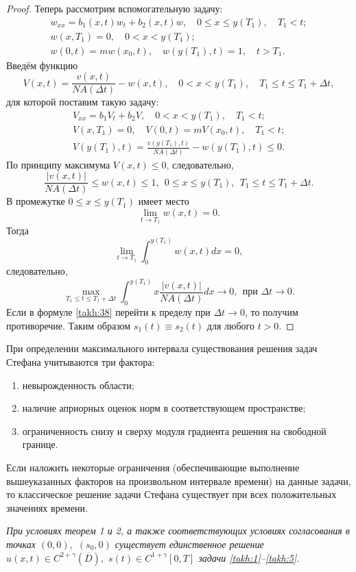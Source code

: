 \begin{proof}
Теперь рассмотрим вспомогательную задачу:
\begin{gather*}
w_{xx}=b_1(x,t)w_t+b_2(x,t)w,\quad  0\leq x\leq y(T_1), \quad  T_1< t;
\\
w(x,T_1)=0, \quad   0<x<y(T_1); \\ w(0,t)=mw(x_0,t), \quad w(y(T_1),t)=1, \quad  t>T_1.
\end{gather*}
Введём функцию
$$
V(x,t)=\frac{v(x,t)}{NA(\Delta t)}-w(x,t), \quad  0<x<y(T_1), \quad 
T_1\leq t\leq T_1+\Delta t,
$$
для которой поставим такую задачу:
\begin{gather*}
V_{xx}=b_1V_t+b_2V, \quad  0<x<y(T_1), \quad  T_1<t;
\\
V(x,T_1)=0, \quad  V(0, t)=mV(x_0, t), \quad  T_1<t;
\\
V(y(T_1),t)=\frac{v(y(T_1),t)}{NA(\Delta t)}-w(y(T_1),t)\leq 0.
\end{gather*}
По принципу максимума $V(x,t)\leq0$, следовательно,
$$
\frac{|v(x,t)|}{NA(\Delta t)}\leq w(x,t)\leq1, \ \ 0\leq x\leq
y(T_1), \ \ T_1\leq t\leq T_1+\Delta t.
$$
В промежутке $0\leq x\leq y(T_1)$ имеет место
$$
\lim\limits_{t\to  T_1}w(x,t)=0.
$$
Тогда 
$$
\lim\limits_{t\to  T_1}\int_{0}^{y(T_1)}w(x,t)dx=0,
$$
следовательно,
$$
\max\limits_{T_1\leq t\leq T_1+\Delta t}\int_{0}^{y(T_1)}
x\frac{|v(x,t)|}{NA(\Delta t)}dx\to 0, \ \ \text{при }
\Delta t\to 0.
$$
Если в формуле \eqref{takh:38} перейти к пределу при $\Delta t\to 0$,
то получим противоречие.
Таким образом $s_1(t)\equiv s_2(t)$ для любого $t>0$. \end{proof}

\smallskip

При определении максимального интервала существования решения
задач Стефана учитываются три фактора: 
\begin{enumerate}
\item невырожденность области;
\item  наличие априорных оценок норм в соответствующем пространстве;
\item  ограниченность снизу и сверху модуля градиента решения на
свободной границе.
\end{enumerate}

Если наложить некоторые ограничения  (обеспечивающие выполнение вышеуказанных факторов на произвольном интервале времени) на данные задачи, то классическое решение задачи Стефана существует при всех положительных значениях времени.

\begin{theorem}[4]\sl При условиях теорем 1 и 2{\rm ,} а также
соответствующих условиях согласования в точках $(0, 0),$ $(s_0, 0)$
существует единственное решение $u(x,t)\in C^{2+\gamma}(\overline{D}),$ $s(t)\in C^{1+\gamma}[0,T]$ задачи \rm
\eqref{takh:1}--\eqref{takh:5}.
\end{theorem}

